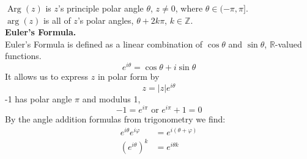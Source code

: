 \documentclass[11pt]{article}
\begin{document}
$\operatorname{Arg}(z)$ is $z$'s principle polar angle $\theta$, $z \neq 0$, where $\theta \in (-\pi, \pi]$. \\
$\operatorname{arg}(z)$ is all of $z$'s polar angles, $\theta + 2k\pi$, $k \in \mathbb{Z}$. \\
\newline
\textbf{Euler's Formula.} \\
Euler's Formula is defined as a linear combination of $\cos\theta$ and $\sin\theta$, $\mathbb{R}$-valued functions. 
$$ e^{i\theta}= \cos\theta + i\sin\theta $$
It allows us to express $z$ in polar form by 
$$ z = |z|e^{i\theta}$$
-1 has polar angle $\pi$ and modulus 1, 
\begin{equation*}
-1 = e^{i\pi} \text{ or } e^{i\pi} + 1 = 0
\end{equation*}
By the angle addition formulas from trigonometry we find: 
\begin{align*}
e^{i\theta}e^{i\varphi} &= e^{i(\theta + \varphi)} \\
(e^{i\theta})^k &= e^{i\theta k}
\end{align*}
\end{document}
